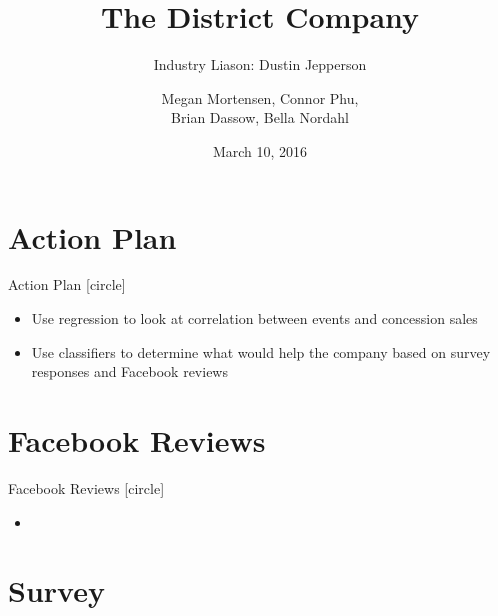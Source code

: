\documentclass[compress,blue]{beamer}
\title{The District Company}
\subtitle{Industry Liason: Dustin Jepperson}
\author{Megan Mortensen, Connor Phu, \\
Brian Dassow, Bella Nordahl}
\institute{\textbf{University of Wisconsin-Stout} \\
}
\date{March 10, 2016}
\begin{document}
\frame{\titlepage}




\section{Action Plan}

\begin{frame}{Action Plan}
[circle]
\begin{itemize}
  \item Use regression to look at correlation between events and concession
  sales
  \item Use classifiers to determine what would help the company based on survey
  responses and Facebook reviews
\end{itemize}
\end{frame}

\section{Facebook Reviews}

\begin{frame}{Facebook Reviews}
[circle]
\begin{itemize}
  \item 
\end{itemize}
\end{frame}

\section{Survey}
\end{document}
